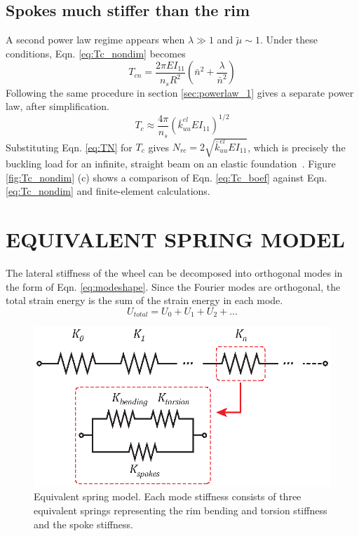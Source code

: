 \documentclass{bmd2016p}
\begin{document}
\subsection{Spokes much stiffer than the rim}
A second power law regime appears when $\lambda \gg 1$ and $\tilde{\mu} \sim 1$. Under these conditions, Eqn. \ref{eq:Tc_nondim} becomes
	\begin{equation}\label{eq:Tcn_boef}
	T_{cn} = \frac{2\pi EI_{11}}{n_sR^2}\left(\bar{n}^2 + \frac{\lambda}{\bar{n}^2} \right)
	\end{equation}
Following the same procedure in section \ref{sec:powerlaw_1} gives a separate power law, after simplification.
	\begin{equation}\label{eq:Tc_boef}
	T_c \approx \frac{4\pi}{n_s} \left(\bar{k}_{uu}^{el}EI_{11} \right)^{1/2} 
	\end{equation}
Substituting Eqn. \ref{eq:TN} for $T_c$ gives $N_{rc}=2\sqrt{\bar{k}_{uu}^{el}EI_{11}}$, which is precisely the buckling load for an infinite, straight beam on an elastic foundation~\cite{Hetenyi1946a}. Figure \ref{fig:Tc_nondim} (c) shows a comparison of Eqn. \ref{eq:Tc_boef} against Eqn. \ref{eq:Tc_nondim} and finite-element calculations.



\section{EQUIVALENT SPRING MODEL}
The lateral stiffness of the wheel can be decomposed into orthogonal modes in the form of Eqn. \ref{eq:modeshape}. Since the Fourier modes are orthogonal, the total strain energy is the sum of the strain energy in each mode.
	\begin{equation}\label{eq:Umode}
	U_{total} = U_0 + U_1 + U_2 + ...
	\end{equation}

\begin{figure}[!ht]
\centering
\includegraphics[scale=1.0]{figures/bmd_figures-03.eps}
\caption{Equivalent spring model. Each mode stiffness consists of three equivalent springs representing the rim bending and torsion stiffness and the spoke stiffness.}
\label{fig:Kn}
\end{figure}
\end{document}
